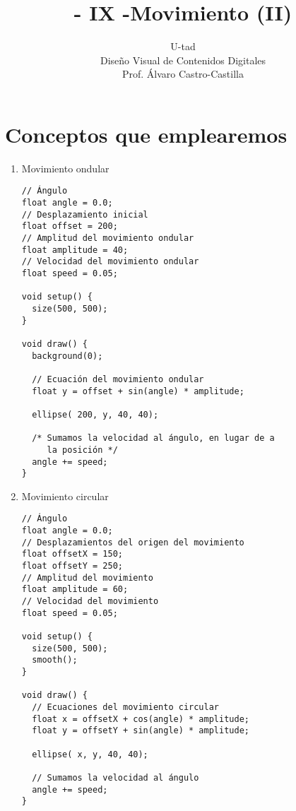 \documentclass[a4paper,oneside]{article}
\title{- IX -\linebreak Movimiento (II)}
\author{U-tad\\ Diseño Visual de Contenidos Digitales\\ Prof. Álvaro Castro-Castilla}
\date{}
\begin{document}
\maketitle


\section{Conceptos que emplearemos}
\begin{enumerate}
  \item Movimiento ondular

    \begin{verbatim}
// Ángulo
float angle = 0.0;
// Desplazamiento inicial
float offset = 200;
// Amplitud del movimiento ondular
float amplitude = 40;
// Velocidad del movimiento ondular
float speed = 0.05;

void setup() {
  size(500, 500);
}

void draw() {
  background(0);

  // Ecuación del movimiento ondular
  float y = offset + sin(angle) * amplitude;

  ellipse( 200, y, 40, 40);

  /* Sumamos la velocidad al ángulo, en lugar de a
     la posición */
  angle += speed;
}
    \end{verbatim}

\newpage
  \item Movimiento circular

    \begin{verbatim}
// Ángulo
float angle = 0.0;
// Desplazamientos del origen del movimiento
float offsetX = 150;
float offsetY = 250;
// Amplitud del movimiento
float amplitude = 60;
// Velocidad del movimiento
float speed = 0.05;

void setup() {
  size(500, 500);
  smooth();
}

void draw() {
  // Ecuaciones del movimiento circular
  float x = offsetX + cos(angle) * amplitude;
  float y = offsetY + sin(angle) * amplitude;

  ellipse( x, y, 40, 40);

  // Sumamos la velocidad al ángulo
  angle += speed;
}
    \end{verbatim}

\end{enumerate}
\end{document}
